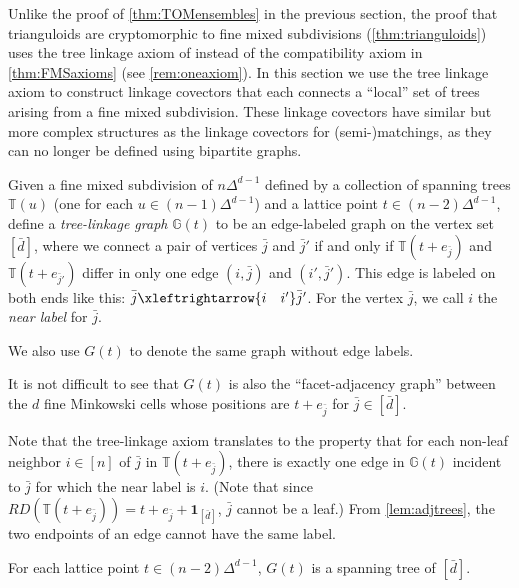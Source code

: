 \documentclass[letterpaper,reqno,11pt]{amsart}
\begin{document}
Unlike the proof of \cref{thm:TOMensembles} in the previous section, the proof that trianguloids are cryptomorphic to fine mixed subdivisions (\cref{thm:trianguloids}) uses the tree linkage axiom of  instead of the compatibility axiom in \cref{thm:FMSaxioms} (see \cref{rem:oneaxiom}). In this section we use the tree linkage axiom to construct linkage covectors that each connects a ``local'' set of trees arising from a fine mixed subdivision. These linkage covectors have similar but more complex structures as the linkage covectors for (semi-)matchings, as they can no longer be defined using bipartite graphs.

\begin{definition}
    Given a fine mixed subdivision of $n\Delta^{d-1}$ defined by a collection of spanning trees $\mathbb{T}(u)$ (one for each $u\in (n-1)\Delta^{d-1}$) and a lattice point $t\in (n-2)\Delta^{d-1}$, define a \emph{tree-linkage graph} $\mathbb{G}(t)$ to be an edge-labeled graph on the vertex set $[\bar{d}]$, where we connect a pair of vertices $\bar{j}$ and $\bar{j}'$ if and only if $\mathbb{T}(t+e_{\bar{j}})$ and $\mathbb{T}(t+e_{\bar{j}'})$ differ in only one edge $(i, \bar{j})$ and $(i', \bar{j}')$. This edge is labeled on both ends like this: $\bar{j} \xleftrightarrow{i\quad i'}\bar{j}'$. For the vertex $\bar{j}$, we call $i$ the \emph{near label} for $\bar{j}$.
    
    We also use $G(t)$ to denote the same graph without edge labels.
\end{definition}

It is not difficult to see that $G(t)$ is also the ``facet-adjacency graph'' between the $d$ fine Minkowski cells whose positions are $t + e_{\bar{j}}$ for $\bar{j}\in [\bar{d}]$. 

\begin{remark}\label{rem:basicproperties}
    Note that the tree-linkage axiom translates to the property that for each non-leaf neighbor $i\in [n]$ of $\bar{j}$ in $\mathbb{T}(t+e_{\bar{j}})$, there is exactly one edge in $\mathbb{G}(t)$ incident to $\bar{j}$ for which the near label is $i$. (Note that since $RD(\mathbb{T}(t+e_{\bar{j}})) = t + e_{\bar{j}} + \mathbf{1}_{[\bar{d}]}$, $\bar{j}$ cannot be a leaf.) From \cref{lem:adjtrees}, the two endpoints of an edge cannot have the same label.
\end{remark}

\begin{proposition}\label{prop:treelinkagetree}
    For each lattice point $t\in (n-2)\Delta^{d-1}$, $G(t)$ is a spanning tree of $[\bar{d}]$.
\end{proposition}
\end{document}
